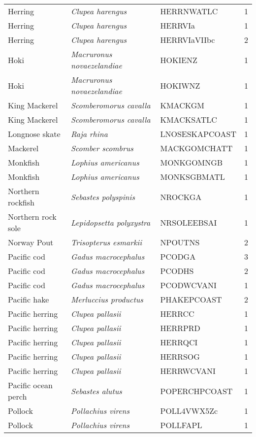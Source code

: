 \begin{center}
\begin{footnotesize}
\begin{longtable}{l | l | l | r}
Herring & \textit{Clupea harengus} & HERRNWATLC & 1 \\
Herring & \textit{Clupea harengus} & HERRVIa & 1 \\
Herring & \textit{Clupea harengus} & HERRVIaVIIbc & 2 \\
Hoki & \textit{Macruronus novaezelandiae} & HOKIENZ & 1 \\
Hoki & \textit{Macruronus novaezelandiae} & HOKIWNZ & 1 \\
King Mackerel & \textit{Scomberomorus cavalla} & KMACKGM & 1 \\
King Mackerel & \textit{Scomberomorus cavalla} & KMACKSATLC & 1 \\
Longnose skate & \textit{Raja rhina} & LNOSESKAPCOAST & 1 \\
Mackerel & \textit{Scomber scombrus} & MACKGOMCHATT & 1 \\
Monkfish & \textit{Lophius americanus} & MONKGOMNGB & 1 \\
Monkfish & \textit{Lophius americanus} & MONKSGBMATL & 1 \\
Northern rockfish & \textit{Sebastes polyspinis} & NROCKGA & 1 \\
Northern rock sole & \textit{Lepidopsetta polyxystra} & NRSOLEEBSAI & 1 \\
Norway Pout & \textit{Trisopterus esmarkii} & NPOUTNS & 2 \\
Pacific cod & \textit{Gadus macrocephalus} & PCODGA & 3 \\
Pacific cod & \textit{Gadus macrocephalus} & PCODHS & 2 \\
Pacific cod & \textit{Gadus macrocephalus} & PCODWCVANI & 1 \\
Pacific hake & \textit{Merluccius productus} & PHAKEPCOAST & 2 \\
Pacific herring & \textit{Clupea pallasii} & HERRCC & 1 \\
Pacific herring & \textit{Clupea pallasii} & HERRPRD & 1 \\
Pacific herring & \textit{Clupea pallasii} & HERRQCI & 1 \\
Pacific herring & \textit{Clupea pallasii} & HERRSOG & 1 \\
Pacific herring & \textit{Clupea pallasii} & HERRWCVANI & 1 \\
Pacific ocean perch & \textit{Sebastes alutus} & POPERCHPCOAST & 1 \\
Pollock & \textit{Pollachius virens} & POLL4VWX5Zc & 1 \\
Pollock & \textit{Pollachius virens} & POLLFAPL & 1 \\

\end{longtable}
\end{footnotesize}
\end{center}
